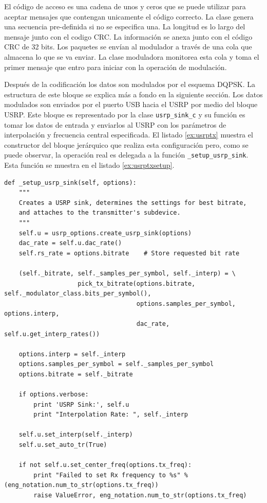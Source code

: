 El c\'odigo de acceso es una cadena de unos y ceros que se puede utilizar para aceptar mensajes que
contengan unicamente el c\'odigo correcto. La clase genera una secuencia pre-definida si no se
especifica una. La longitud es lo largo del mensaje junto con el codigo CRC. La informaci\'on se
anexa junto con el c\'odigo CRC de 32 bits. Los paquetes se env\'ian al modulador a trav\'es de una
cola que almacena lo que se va enviar. La clase moduladora monitorea esta cola y toma el primer
mensaje que entro para iniciar con la operaci\'on de modulaci\'on.

Despu\'es de la codificaci\'on los datos son modulados por el esquema DQPSK. La estructura de este
bloque se explica m\'as a fondo en la siguiente secci\'on. Los datos modulados son enviados por el
puerto USB hacia el USRP por medio del bloque USRP. Este bloque es representado por la clase
\verb|usrp_sink_c| y su funci\'on es tomar los datos de entrada y enviarlos al USRP con los
par\'ametros de interpolaci\'on y frecuencia central especificada. El listado \ref{ex:usrptx}
muestra el constructor del bloque jer\'arquico que realiza esta configuraci\'on pero, como se puede
observar, la operaci\'on real es delegada a la funci\'on \verb|_setup_usrp_sink|. Esta funci\'on se
muestra en el listado \ref{ex:usrptxsetup}.

\begin{lstlisting}[float, label=ex:usrptxsetup, caption={Funci\'on que configura el USRP como
transmisor}, breaklines=true]
def _setup_usrp_sink(self, options):
    """
    Creates a USRP sink, determines the settings for best bitrate,
    and attaches to the transmitter's subdevice.
    """
    self.u = usrp_options.create_usrp_sink(options)
    dac_rate = self.u.dac_rate()
    self.rs_rate = options.bitrate    # Store requested bit rate
        
    (self._bitrate, self._samples_per_symbol, self._interp) = \
                    pick_tx_bitrate(options.bitrate, self._modulator_class.bits_per_symbol(),
                                    options.samples_per_symbol, options.interp,
                                    dac_rate, self.u.get_interp_rates())

    options.interp = self._interp
    options.samples_per_symbol = self._samples_per_symbol
    options.bitrate = self._bitrate

    if options.verbose:
        print 'USRP Sink:', self.u
        print "Interpolation Rate: ", self._interp
    
    self.u.set_interp(self._interp)
    self.u.set_auto_tr(True)

    if not self.u.set_center_freq(options.tx_freq):
        print "Failed to set Rx frequency to %s" % (eng_notation.num_to_str(options.tx_freq))
        raise ValueError, eng_notation.num_to_str(options.tx_freq)
\end{lstlisting}

